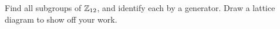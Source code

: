 \documentclass{ximera}
\begin{document}
\begin{exercise}
  Find all subgroups of $\mathbb Z_{12}$, and identify each by a generator.  Draw
  a lattice diagram to show off your work.
\end{exercise}

  







  



\end{document}
